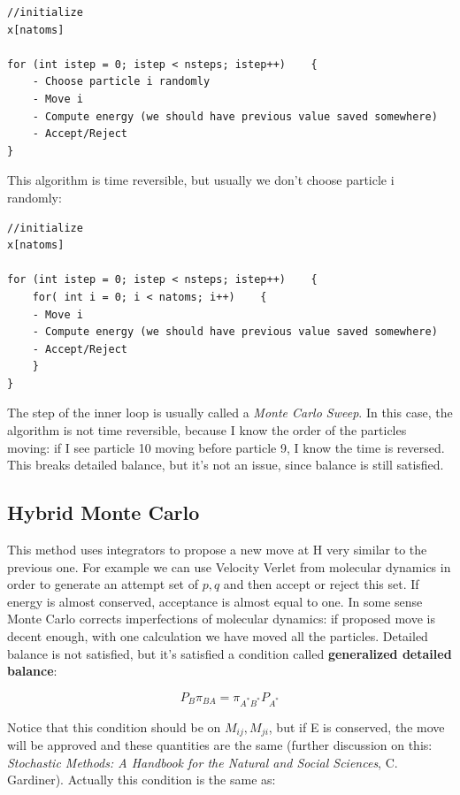 \documentclass[a4paper, italian, openany]{book}
\begin{document}
\begin{lstlisting}
//initialize
x[natoms]

for (int istep = 0; istep < nsteps; istep++)	{
	- Choose particle i randomly
	- Move i
	- Compute energy (we should have previous value saved somewhere)
	- Accept/Reject
}
\end{lstlisting}

This algorithm is time reversible, but usually we don't choose particle i randomly:

\begin{lstlisting}
//initialize
x[natoms]

for (int istep = 0; istep < nsteps; istep++)	{
	for( int i = 0; i < natoms; i++)	{
	- Move i
	- Compute energy (we should have previous value saved somewhere)
	- Accept/Reject
	}
}
\end{lstlisting}

The step of the inner loop is usually called a \textit{Monte Carlo Sweep}. In this case, the algorithm is not time reversible, because I know the order of the particles moving: if I see particle 10 moving before particle 9, I know the time is reversed. This breaks detailed balance, but it's not an issue, since balance is still satisfied.

\subsection{Hybrid Monte Carlo}

This method uses integrators to propose a new move at H very similar to the previous one. For example we can use Velocity Verlet from molecular dynamics in order to generate an attempt set of $p, q$ and then accept or reject this set. If energy is almost conserved, acceptance is almost equal to one.\newline
In some sense Monte Carlo corrects imperfections of molecular dynamics: if proposed move is decent enough, with one calculation we have moved all the particles.\newline
Detailed balance is not satisfied, but it's satisfied a condition called \textbf{generalized detailed balance}:

$$P_B \pi_{BA} = \pi_{A^*B^*} P_{A^*}$$

Notice that this condition should be on $M_{ij}, M_{ji}$, but if E is conserved, the move will be approved and these quantities are the same (further discussion on this: \textit{Stochastic Methods: A Handbook for the Natural and Social Sciences}, C. Gardiner).\newline
Actually this condition is the same as:
\end{document}
